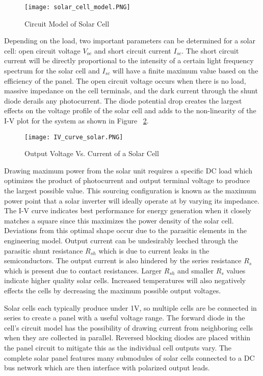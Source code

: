 \begin{figure}
\centering
\texttt{[image: solar\_cell\_model.PNG]}
\caption{Circuit Model of Solar Cell\cite{soteris}}
\label{circuitModel}
\end{figure}

Depending on the load, two important parameters can be determined for a solar cell: open circuit voltage $V_{oc}$ and short circuit current $I_{sc}$. The short circuit current will be directly proportional to the intensity of a certain light frequency spectrum for the solar cell and $I_{sc}$ will have a finite maximum value based on the efficiency of the panel. The open circuit voltage occurs when there is no load, massive impedance on the cell terminals, and the dark current through the shunt diode derails any photocurrent. The diode potential drop creates the largest effects on the voltage profile of the solar cell and adds to the non-linearity of the I-V plot for the system as shown in Figure ~\ref{Output Voltage Vs. Current of a Solar Cell}. \cite{soteris}

\begin{figure}
\centering
\texttt{[image: IV\_curve\_solar.PNG]}
\caption{Output Voltage Vs. Current of a Solar Cell\cite{soteris}}
\label{Output Voltage Vs. Current of a Solar Cell}
\end{figure}

Drawing maximum power from the solar unit requires a specific DC load which optimizes the product of photocurrent and output terminal voltage to produce the largest possible value. This sourcing configuration is known as the maximum power point that a solar inverter will ideally operate at by varying its impedance. The I-V curve indicates best performance for energy generation when it closely matches a square since this maximizes the power density of the solar cell. Deviations from this optimal shape occur due to the parasitic elements in the engineering model. Output current can be undesirably leeched through the parasitic shunt resistance $R_{sh}$ which is due to current leaks in the semiconductors. The output current is also hindered by the series resistance $R_{s}$ which is present due to contact resistances. Larger $R_{sh}$ and smaller $R_{s}$ values indicate higher quality solar cells. Increased temperatures will also negatively effects the cells by decreasing the maximum possible output voltages.

Solar cells each typically produce under 1V, so multiple cells are be connected in series to create a panel with a useful voltage range. The forward diode in the cell's circuit model has the possibility of drawing current from neighboring cells when they are collected in parallel. Reversed blocking diodes are placed within the panel circuit to mitigate this as the individual cell outputs vary. The complete solar panel features many submodules of solar cells connected to a DC bus network which are then interface with polarized output leads.

